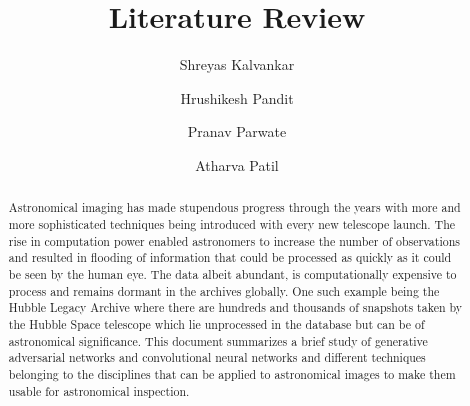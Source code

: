 \documentclass[12pt, letterpaper]{article}
\title{Literature Review}
\author{Shreyas Kalvankar \and Hrushikesh Pandit \and Pranav Parwate \and Atharva Patil}
\begin{document}
	\maketitle
	
	\begin{abstract}
		Astronomical imaging has made stupendous progress through the years with more and more sophisticated techniques being introduced with every new telescope launch. The rise in computation power enabled astronomers to increase the number of observations and resulted in flooding of information that could be processed as quickly as it could be seen by the human eye. The data albeit abundant, is computationally expensive to process and remains dormant in the archives globally. One such example being the Hubble Legacy Archive where there are hundreds and thousands of snapshots taken by the Hubble Space telescope which lie unprocessed in the database but can be of astronomical significance. This document summarizes a brief study of generative adversarial networks and convolutional neural networks and different techniques belonging to the disciplines that can be applied to astronomical images to make them usable for astronomical inspection. 
	\end{abstract}
\end{document}
